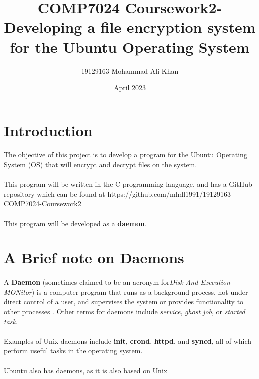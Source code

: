 \documentclass{article}
\title{COMP7024 Coursework2- Developing a file encryption system for the Ubuntu Operating System}
\author{19129163 Mohammad Ali Khan}
\date{April 2023}
\begin{document}
\maketitle

\section{Introduction}
    \paragraph{}The objective of this project is to develop a program for the Ubuntu Operating System (OS) that will encrypt and decrypt files on the system.
    \paragraph{}This program will be written in the C programming language, and has a GitHub repository which can be found at https://github.com/mhdl1991/19129163-COMP7024-Coursework2
    \paragraph{}This program will be developed as a \textbf{daemon}.

\section{A Brief note on Daemons}
    \paragraph{}A \textbf{Daemon} (sometimes claimed to be an acronym for\textit{Disk And Execution MONitor}) is a computer program that runs as a background process, not under direct control of a user, and supervises the system or provides functionality to other processes . Other terms for daemons include \textit{service}, \textit{ghost job}, or \textit{started task}.
    
    \paragraph{}Examples of Unix daemons include \textbf{init}, \textbf{crond}, \textbf{httpd}, and \textbf{syncd}, all of which perform useful tasks in the operating system.

    \paragraph{}Ubuntu also has daemons, as it is also based on Unix
\end{document}
